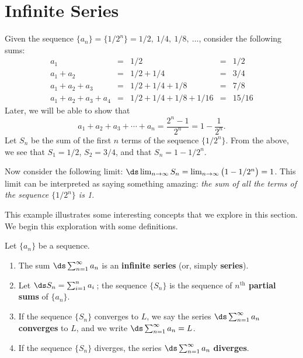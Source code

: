 \section{Infinite Series}\label{sec:series}

Given the sequence $\{a_n\} = \{1/2^n\} = 1/2,\ 1/4,\ 1/8,\ \dotsc$, consider the following sums:
\[
\begin{array}{ccccc}
a_1				&=& 1/2					&=& 1/2\\
a_1+a_2			&=& 1/2+1/4				&=& 3/4\\
a_1+a_2+a_3		&=& 1/2+1/4+1/8			&=& 7/8\\
a_1+a_2+a_3+a_4	&=& 1/2+1/4+1/8+1/16		&=& 15/16
\end{array}
\]
Later, we will be able to show that
\[a_1+a_2+a_3+\dotsb+a_n = \frac{2^n-1}{2^n} = 1-\frac{1}{2^n}.\]
Let $S_n$ be the sum of the first $n$ terms of the sequence $\{1/2^n\}$. From the above, we see that $S_1=1/2$, $S_2 = 3/4$, and that $S_n = 1-1/2^n$. 

Now consider the following limit: $\ds \lim_{n\to\infty}S_n = \lim_{n\to\infty}\big(1-1/2^n\big) = 1$. This limit can be interpreted as saying something amazing: \emph{the sum of \emph{all} the terms of the sequence $\{1/2^n\}$ is 1.} 


This example illustrates some interesting concepts that we explore in this section. We begin this exploration with some definitions.


{Let $\{a_n\}$ be a sequence.
\begin{enumerate}
\item		The sum $\ds \sum_{n=1}^\infty a_n$ is an \textbf{infinite series} (or, simply \textbf{series}).
\item		Let $\ds S_n = \sum_{i=1}^n a_i$\,; the sequence $\{S_n\}$ is the sequence of \textbf{$n^\text{th}$ partial sums} of $\{a_n\}$.
\item		If the sequence $\{S_n\}$ converges to $L$, we say the series $\ds \sum_{n=1}^\infty a_n$ \textbf{converges} to $L$, and we write $\ds \sum_{n=1}^\infty a_n = L$.
\item		If the sequence $\{S_n\}$ diverges, the series $\ds \sum_{n=1}^\infty a_n$ \textbf{diverges}.
\end{enumerate}}

